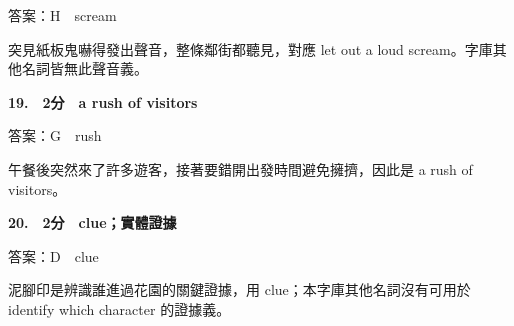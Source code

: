 \documentclass[11pt,a4paper]{article}
\begin{document}
答案：H　scream
\par\smallskip
突見紙板鬼嚇得發出聲音，整條鄰街都聽見，對應 let out a loud scream。字庫其他名詞皆無此聲音義。
\par\smallskip
\medskip
{}\textbf{19.　2分　a rush of visitors}\par
答案：G　rush
\par\smallskip
午餐後突然來了許多遊客，接著要錯開出發時間避免擁擠，因此是 a rush of visitors。
\par\smallskip
\medskip
{}\textbf{20.　2分　clue；實體證據}\par
答案：D　clue
\par\smallskip
泥腳印是辨識誰進過花園的關鍵證據，用 clue；本字庫其他名詞沒有可用於 identify which character 的證據義。
\par\smallskip
\medskip

\newpage
\end{document}
